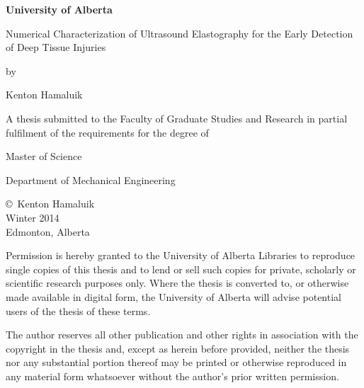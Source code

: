 \begin{center}

{\fontsize{14pt}{1em}\selectfont \textbf{University of Alberta}}
\vspace{3em}

{\fontsize{13pt}{1em}\selectfont Numerical Characterization of Ultrasound Elastography for the Early Detection of Deep Tissue Injuries}
\vspace{2em}

{\fontsize{10pt}{1em} by}
\vspace{1em}

{\fontsize{13pt}{1em} Kenton Hamaluik}
\vspace{5em}

{\fontsize{11pt}{1em} A thesis submitted to the Faculty of Graduate Studies and Research in partial fulfilment of the requirements for the degree of}
\vspace{3em}

{\fontsize{13pt}{1em} Master of Science}
\vspace{4em}

{\fontsize{13pt}{1em} Department of Mechanical Engineering}
\vspace{5em}

{\fontsize{11pt}{1em}\copyright\ Kenton Hamaluik \\
Winter 2014 \\
Edmonton, Alberta}
\vfill

{\fontsize{9pt}{1em} Permission is hereby granted to the University of Alberta Libraries to reproduce single copies of this thesis and to lend or sell such copies for private, scholarly or scientific research purposes only. Where the thesis is converted to, or otherwise made available in digital form, the University of Alberta will advise potential users of the thesis of these terms.
\vspace{1em}

The author reserves all other publication and other rights in association with the copyright in the thesis and, except as herein before provided, neither the thesis nor any substantial portion thereof may be printed or otherwise reproduced in any material form whatsoever without the author's prior written permission.}
\end{center}
